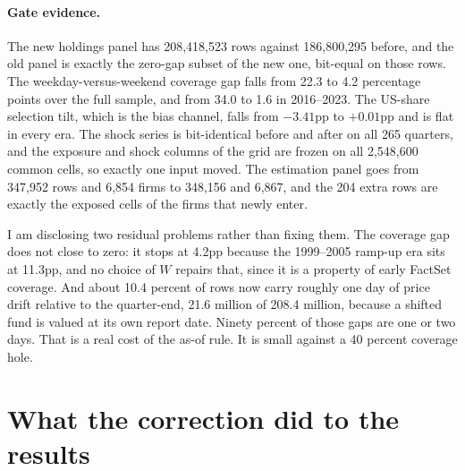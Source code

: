 \documentclass[11pt]{article}
\begin{document}
\paragraph{Gate evidence.} The new holdings panel has 208,418,523 rows against
186,800,295 before, and the old panel is exactly the zero-gap subset of the
new one, bit-equal on those rows. The weekday-versus-weekend coverage gap falls
from 22.3 to 4.2 percentage points over the full sample, and from 34.0 to 1.6
in 2016--2023. The US-share selection tilt, which is the bias channel, falls
from $-3.41$pp to $+0.01$pp and is flat in every era. The shock series is
bit-identical before and after on all 265 quarters, and the exposure and shock
columns of the grid are frozen on all 2,548,600 common cells, so exactly one
input moved. The estimation panel goes from 347,952 rows and 6,854 firms to
348,156 and 6,867, and the 204 extra rows are exactly the exposed cells of the
firms that newly enter.

I am disclosing two residual problems rather than fixing them. The coverage gap
does not close to zero: it stops at 4.2pp because the 1999--2005 ramp-up era
sits at 11.3pp, and no choice of $W$ repairs that, since it is a property of
early FactSet coverage. And about 10.4 percent of rows now carry roughly one
day of price drift relative to the quarter-end, 21.6 million of 208.4 million,
because a shifted fund is valued at its own report date. Ninety percent of
those gaps are one or two days. That is a real cost of the as-of rule. It is
small against a 40 percent coverage hole.

\section{What the correction did to the results}
\end{document}
